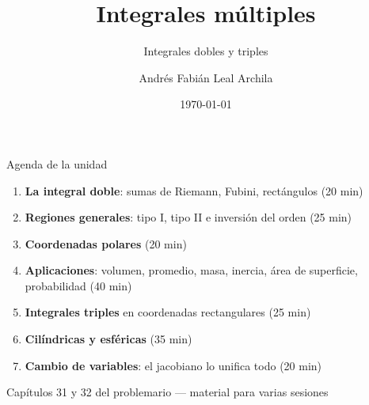 \documentclass[11pt,aspectratio=169]{beamer}
\title{Integrales múltiples}
\subtitle{Integrales dobles y triples}
\author{Andrés Fabián Leal Archila}
\institute{Cálculo III (Multivariable) --- Cód. 20254}
\date{\today}
\begin{document}
\portada

\begin{frame}{Agenda de la unidad}
  \begin{enumerate}
    \setlength{\itemsep}{6pt}
    \item \textbf{La integral doble}: sumas de Riemann, Fubini, rectángulos \hfill{\small\color{gray60}(20 min)}
    \item \textbf{Regiones generales}: tipo I, tipo II e inversión del orden \hfill{\small\color{gray60}(25 min)}
    \item \textbf{Coordenadas polares} \hfill{\small\color{gray60}(20 min)}
    \item \textbf{Aplicaciones}: volumen, promedio, masa, inercia, área de superficie, probabilidad \hfill{\small\color{gray60}(40 min)}
    \item \textbf{Integrales triples} en coordenadas rectangulares \hfill{\small\color{gray60}(25 min)}
    \item \textbf{Cilíndricas y esféricas} \hfill{\small\color{gray60}(35 min)}
    \item \textbf{Cambio de variables}: el jacobiano lo unifica todo \hfill{\small\color{gray60}(20 min)}
  \end{enumerate}
  \vfill
  \begin{center}
    \small\color{gray60} Capítulos 31 y 32 del problemario --- material para varias sesiones
  \end{center}
\end{frame}
\end{document}
